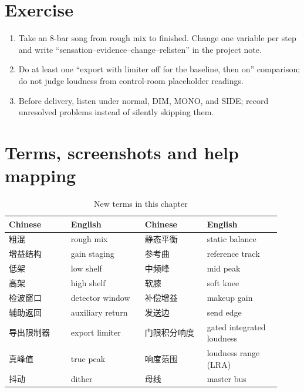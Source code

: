 \section{Exercise}


\begin{exercise}
\begin{enumerate}
  \item Take an 8-bar song from rough mix to finished. Change one variable per step and write ``sensation--evidence--change--relisten'' in the project note.
  \item Do at least one ``export with limiter off for the baseline, then on'' comparison; do not judge loudness from control-room placeholder readings.
  \item Before delivery, listen under normal, DIM, MONO, and SIDE; record unresolved problems instead of silently skipping them.
\end{enumerate}
\end{exercise}

\section{Terms, screenshots and help mapping}

\begin{table}[htbp]
\centering
\small
\begin{tabular}{@{}p{0.21\linewidth}p{0.25\linewidth}p{0.21\linewidth}p{0.25\linewidth}@{}}
\hline
Chinese & English & Chinese & English \\
\hline
粗混 & rough mix & 静态平衡 & static balance \\
增益结构 & gain staging & 参考曲 & reference track \\
低架 & low shelf & 中频峰 & mid peak \\
高架 & high shelf & 软膝 & soft knee \\
检波窗口 & detector window & 补偿增益 & makeup gain \\
辅助返回 & auxiliary return & 发送边 & send edge \\
导出限制器 & export limiter & 门限积分响度 & gated integrated loudness \\
真峰值 & true peak & 响度范围 & loudness range (LRA) \\
抖动 & dither & 母线 & master bus \\
\hline
\end{tabular}
\caption{New terms in this chapter}
\label{tab:walk-terms}
\end{table}

